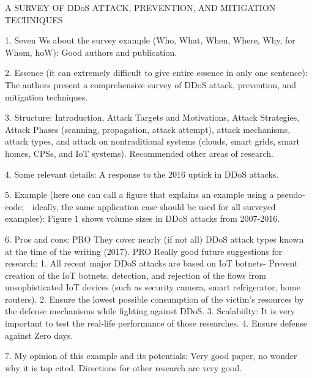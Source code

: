 A SURVEY OF DDoS ATTACK, PREVENTION, AND MITIGATION TECHNIQUES

1. Seven Ws about the survey example (Who, What, When, Where, Why, for Whom, hoW): Good authors and publication.


2. Essence (it can extremely difficult to give entire essence in only one sentence): The authors present a comprehensive survey of DDoS attack, prevention, and mitigation techniques.

3. Structure: Introduction, Attack Targets and Motivations, Attack Strategies, Attack Phases (scanning, propagation, attack attempt), attack mechanisms, attack types, and attack on nontraditional systems (clouds, smart grids, smart homes, CPSs, and IoT systems). Recommended other areas of research.

4. Some relevant details: A response to the 2016 uptick in DDoS attacks.

5. Example (here one can call a figure that explains an example using a pseudo-code;  ideally, the same application case should be used for all surveyed examples): Figure 1 shows volume sizes in DDoS attacks from 2007-2016.

6. Pros and cons: 
PRO They cover nearly (if not all) DDoS attack types known at the time of the writing (2017). 
PRO Really good future suggestions for research:
1.  All recent major DDoS attacks are based on IoT botnets- Prevent creation of the IoT botnets, detection, and rejection of the flows from unsophisticated IoT devices (such as security camera, smart refrigerator, home routers).
2. Ensure the lowest possible consumption of the victim’s resources by the defense mechanisms while fighting against DDoS.
3. Scalabiilty: It is very important to test the real-life performance of those researches.
4. Ensure defense against Zero days.

7. My opinion of this example and its potentials: Very good paper, no wonder why it is top cited. Directions for other research are very good.